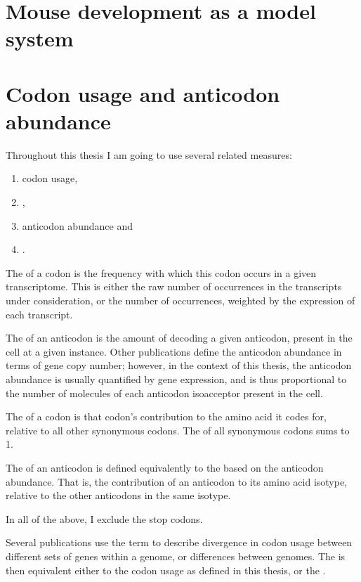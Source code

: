 \section{Mouse development as a model system}

\section{Codon usage and anticodon abundance}


Throughout this thesis I am going to use several related measures:

\begin{enumerate}
    \item codon usage,
    \item \rcu,
    \item anticodon abundance and
    \item \raa.
\end{enumerate}

The  of a codon is the frequency with which this codon
occurs in a given transcriptome. This is either the raw number of occurrences in
the transcripts under consideration, or the number of occurrences, weighted by
the expression of each transcript.

The  of an anticodon is the amount of \trna
decoding a given anticodon, present in the cell at a given instance. Other
publications define the anticodon abundance in terms of \trna gene copy number;
however, in the context of this thesis, the anticodon abundance is usually
quantified by \trna gene expression, and is thus proportional to the number of
\trna molecules of each anticodon isoacceptor present in the cell.

The  of a codon is that codon’s contribution to the amino acid it
codes for, relative to all other synonymous codons. The \rcu of all synonymous
codons sums to \num{1}.

The  of an anticodon is defined equivalently to the \rcu based on
the anticodon abundance. That is, the contribution of an anticodon to its amino
acid isotype, relative to the other anticodons in the same isotype.

In all of the above, I exclude the stop codons.

Several publications use the term \cub to describe divergence in codon usage
between different sets of genes within a genome, or differences between genomes.
The \cub is then equivalent either to the codon usage as defined in this thesis,
or the \rcu.

